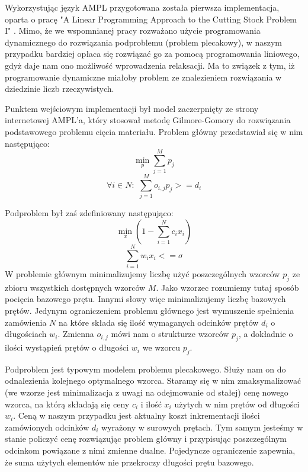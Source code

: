 Wykorzystując język AMPL przygotowana została pierwsza implementacja, oparta o pracę "A Linear Programming Approach to the Cutting Stock Problem I" \cite{linear-programming-gilmore}. Mimo, że we wspomnianej pracy rozważano użycie programowania dynamicznego do rozwiązania podproblemu (problem plecakowy), w naszym przypadku bardziej opłaca się rozwiązać go za pomocą programowania liniowego, gdyż daje nam ono możliwość wprowadzenia relaksacji. Ma to związek z tym, iż programowanie dynamiczne miałoby problem ze znalezieniem rozwiązania w dziedzinie liczb rzeczywistych. 

Punktem wejściowym implementacji był model zaczerpnięty ze strony internetowej AMPL'a, który stosował metodę Gilmore-Gomory do rozwiązania podstawowego problemu cięcia materiału. Problem główny przedstawiał się w nim następująco:
\begin{equation}
    \min_p \sum_{j=1}^{M} p_j
\end{equation}
\begin{equation}
    \forall{i} \! \in \! N\!: \,\, \sum_{j=1}^{M} o_{i,j} p_j >= d_i
\end{equation}

Podproblem był zaś zdefiniowany następująco:
\begin{equation}
   \min_x (1 - \sum_{i=1}^{N} c_i x_i )
\end{equation}
\begin{equation}
    \sum_{i=1}^{N} w_i x_i <= \sigma
\end{equation}
W problemie głównym minimalizujemy liczbę użyć poszczególnych wzorców \(p_j\) ze zbioru wszystkich dostępnych wzorców \(M\). Jako wzorzec rozumiemy tutaj sposób pocięcia bazowego prętu. Innymi słowy więc minimalizujemy liczbę bazowych prętów. Jedynym ograniczeniem problemu głównego jest wymuszenie spełnienia zamówienia \(N\) na które składa się ilość wymaganych odcinków prętów \(d_i\) o długościach \(w_i\). Zmienna \(o_{i,j}\) mówi nam o strukturze wzorców \(p_j\), a dokładnie o ilości wystąpień prętów o długości \(w_i\) we wzorcu \(p_j\). 

Podproblem jest typowym modelem problemu plecakowego. Służy nam on do odnalezienia kolejnego optymalnego wzorca. Staramy się w nim zmaksymalizować (we wzorze jest minimalizacja z uwagi na odejmowanie od stałej) cenę nowego wzorca, na którą składają się ceny \(c_i\) i ilość \(x_i\) użytych w nim prętów od długości \(w_i\). Ceną w naszym przypadku jest aktualny koszt inkrementacji ilości zamówionych odcinków \(d_i\) wyrażony w surowych prętach. Tym samym jesteśmy w stanie policzyć cenę rozwiązując problem główny i przypisując poszczególnym odcinkom powiązane z nimi zmienne dualne.
Pojedyncze ograniczenie zapewnia, że suma użytych elementów nie przekroczy długości prętu bazowego.

